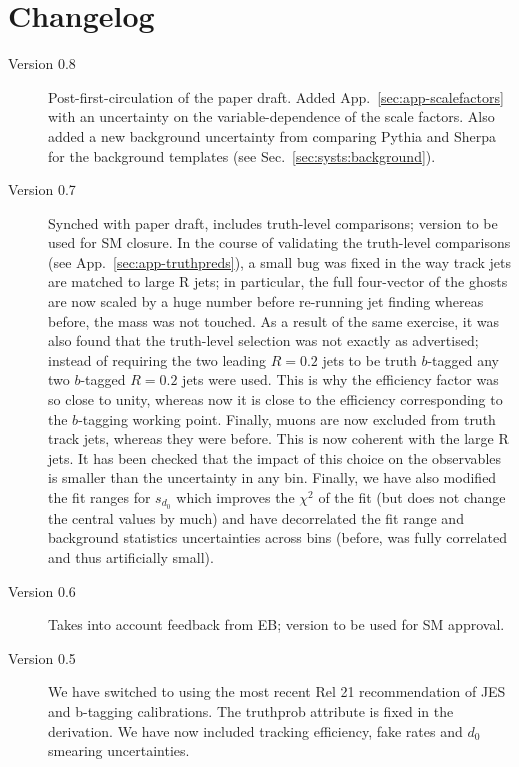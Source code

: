 \documentclass[UKenglish,texlive=2013]{\ATLASLATEXPATH atlasdoc}
\begin{document}
\maketitle

\tableofcontents

\clearpage

\section{Changelog}
\label{sec:change}

\begin{description}
\item[Version 0.8] Post-first-circulation of the paper draft.  Added App.~\ref{sec:app-scalefactors} with an uncertainty on the variable-dependence of the scale factors.   Also added a new background uncertainty from comparing Pythia and Sherpa for the background templates (see Sec.~\ref{sec:systs:background}).
\item[Version 0.7] Synched with paper draft, includes truth-level comparisons; version to be used for SM closure.  In the course of validating the truth-level comparisons (see App.~\ref{sec:app-truthpreds}), a small bug was fixed in the way track jets are matched to large R jets; in particular, the full four-vector of the ghosts are now scaled by a huge number before re-running jet finding whereas before, the mass was not touched.  As a result of the same exercise, it was also found that the truth-level selection was not exactly as advertised; instead of requiring the two leading $R=0.2$ jets to be truth $b$-tagged any two $b$-tagged $R=0.2$ jets were used.  This is why the efficiency factor was so close to unity, whereas now it is close to the efficiency corresponding to the $b$-tagging working point.  Finally, muons are now excluded from truth track jets, whereas they were before.  This is now coherent with the large R jets.  It has been checked that the impact of this choice on the observables is smaller than the uncertainty in any bin.  Finally, we have also modified the fit ranges for $s_{d_0}$ which improves the $\chi^2$ of the fit (but does not change the central values by much) and have decorrelated the fit range and background statistics uncertainties across bins (before, was fully correlated and thus artificially small).
\item[Version 0.6] Takes into account feedback from EB; version to be used for SM approval.
\item[Version 0.5] We have switched to using the most recent Rel 21 recommendation of JES and b-tagging calibrations. The truthprob attribute is fixed in the derivation. We have now included tracking efficiency, fake rates and $d_0$ smearing uncertainties. 

\end{description}
\end{document}
